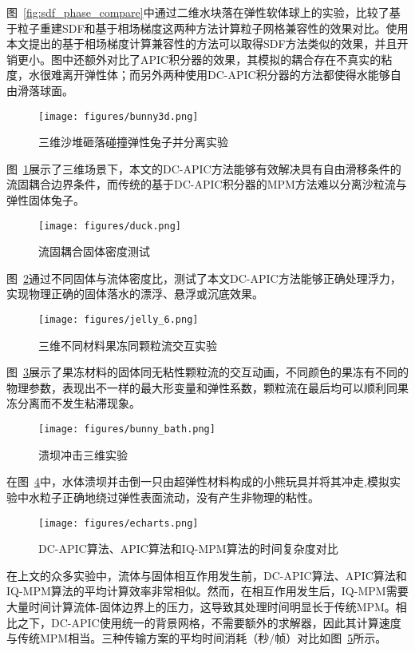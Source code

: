图~\ref{fig:sdf_phase_compare}中通过二维水块落在弹性软体球上的实验，比较了基于粒子重建SDF和基于相场梯度这两种方法计算粒子网格兼容性的效果对比。使用本文提出的基于相场梯度计算兼容性的方法可以取得SDF方法类似的效果，并且开销更小。图中还额外对比了APIC积分器的效果，其模拟的耦合存在不真实的粘度，水很难离开弹性体；而另外两种使用DC-APIC积分器的方法都使得水能够自由滑落球面。


\begin{figure}[H]
    \centering 
    \texttt{[image: figures/bunny3d.png]} 
    \caption{三维沙堆砸落碰撞弹性兔子并分离实验} 
    \label{fig:bunny3d} 
\end{figure}

图~\ref{fig:bunny3d}展示了三维场景下，本文的DC-APIC方法能够有效解决具有自由滑移条件的流固耦合边界条件，而传统的基于DC-APIC积分器的MPM方法难以分离沙粒流与弹性固体兔子。

\begin{figure}[H]
    \centering
    \texttt{[image: figures/duck.png]}
    \caption{流固耦合固体密度测试}
    \label{fig:duck}
\end{figure}
图~\ref{fig:duck}通过不同固体与流体密度比，测试了本文DC-APIC方法能够正确处理浮力，实现物理正确的固体落水的漂浮、悬浮或沉底效果。

\begin{figure}[H]
    \centering
    \texttt{[image: figures/jelly\_6.png]}
    \caption{三维不同材料果冻同颗粒流交互实验}
    \label{fig:jelly}
\end{figure}
图~\ref{fig:jelly}展示了果冻材料的固体同无粘性颗粒流的交互动画，不同颜色的果冻有不同的物理参数，表现出不一样的最大形变量和弹性系数，颗粒流在最后均可以顺利同果冻分离而不发生粘滞现象。

\begin{figure}[H]
    \centering
    \texttt{[image: figures/bunny\_bath.png]}
    \caption{溃坝冲击三维实验}
    \label{fig:bunny_bath}
\end{figure}
在图~\ref{fig:bunny_bath}中，水体溃坝并击倒一只由超弹性材料构成的小熊玩具并将其冲走,模拟实验中水粒子正确地绕过弹性表面流动，没有产生非物理的粘性。

\begin{figure}[H]
    \centering
    \texttt{[image: figures/echarts.png]}
    \caption{DC-APIC算法、APIC算法和IQ-MPM算法的时间复杂度对比}
    \label{fig:echarts}
\end{figure}
在上文的众多实验中，流体与固体相互作用发生前，DC-APIC算法、APIC算法和IQ-MPM算法的平均计算效率非常相似。然而，在相互作用发生后，IQ-MPM需要大量时间计算流体-固体边界上的压力，这导致其处理时间明显长于传统MPM。相比之下，DC-APIC使用统一的背景网格，不需要额外的求解器，因此其计算速度与传统MPM相当。三种传输方案的平均时间消耗（秒/帧）对比如图~\ref{fig:echarts}所示。

